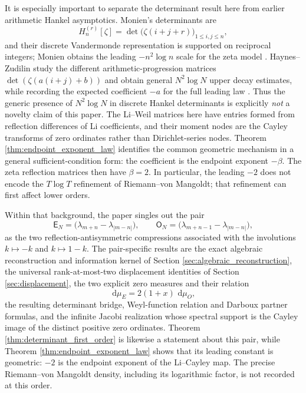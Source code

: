 \documentclass[11pt]{amsart}
\numberwithin{equation}{section}
\theoremstyle{plain}
\theoremstyle{definition}
\theoremstyle{remark}
\newcommand{\E}{\mathsf E}
\newcommand{\Omat}{\mathsf O}
\newcommand{\dd}{\,\mathrm d}
\begin{document}
It is especially important to separate the determinant result here from earlier arithmetic Hankel asymptotics. Monien's determinants are
\begin{equation}
H_n^{(r)}[\zeta]=\det\bigl(\zeta(i+j+r)\bigr)_{1\le i,j\le n},
\label{eq:literature_monien_matrix}
\end{equation}
and their discrete Vandermonde representation is supported on reciprocal integers; Monien obtains the leading $-n^2\log n$ scale for the zeta model \cite{Monien2009}. Haynes--Zudilin study the different arithmetic-progression matrices $\det(\zeta(a(i+j)+b))$ and obtain general $N^2\log N$ upper decay estimates, while recording the expected coefficient $-a$ for the full leading law \cite{HaynesZudilin2015}. Thus the generic presence of $N^2\log N$ in discrete Hankel determinants is explicitly \emph{not} a novelty claim of this paper. The Li--Weil matrices here have entries formed from reflection differences of Li coefficients, and their moment nodes are the Cayley transforms of zero ordinates rather than Dirichlet-series nodes. Theorem \ref{thm:endpoint_exponent_law} identifies the common geometric mechanism in a general sufficient-condition form: the coefficient is the endpoint exponent $-\beta$. The zeta reflection matrices then have $\beta=2$. In particular, the leading $-2$ does not encode the $T\log T$ refinement of Riemann--von Mangoldt; that refinement can first affect lower orders.

Within that background, the paper singles out the pair
\begin{equation}
\E_N=\bigl(\lambda_{m+n}-\lambda_{|m-n|}\bigr),
\qquad
\Omat_N=\bigl(\lambda_{m+n-1}-\lambda_{|m-n|}\bigr),
\label{eq:literature_pair_repeat}
\end{equation}
as the two reflection-antisymmetric compressions associated with the involutions $k\mapsto-k$ and $k\mapsto1-k$.  The pair-specific results are the exact algebraic reconstruction and information kernel of Section \ref{sec:algebraic_reconstruction}, the universal rank-at-most-two displacement identities of Section \ref{sec:displacement}, the two explicit zero measures and their relation
\begin{equation}
\dd\mu_E=2(1+x)\,\dd\mu_O,
\label{eq:literature_measure_bridge}
\end{equation}
the resulting determinant bridge, Weyl-function relation and Darboux partner formulas, and the infinite Jacobi realization whose spectral support is the Cayley image of the distinct positive zero ordinates.  Theorem \ref{thm:determinant_first_order} is likewise a statement about this pair, while Theorem \ref{thm:endpoint_exponent_law} shows that its leading constant is geometric: $-2$ is the endpoint exponent of the Li--Cayley map. The precise Riemann--von Mangoldt density, including its logarithmic factor, is not recorded at this order.
\end{document}
